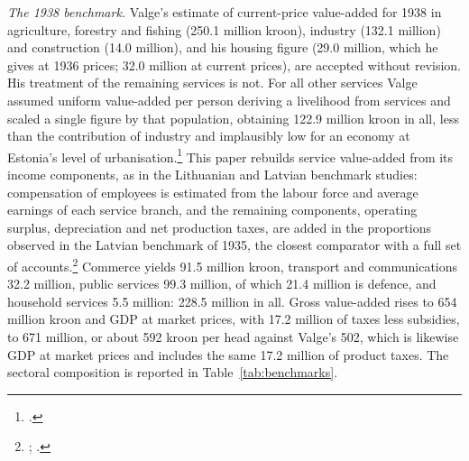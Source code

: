 \textit{The 1938 benchmark.} Valge's estimate of current-price value-added for 1938 in agriculture, forestry and fishing (250.1 million kroon), industry (132.1 million) and construction (14.0 million), and his housing figure (29.0 million, which he gives at 1936 prices; 32.0 million at current prices), are accepted without revision. His treatment of the remaining services is not. For all other services Valge assumed uniform value-added per person deriving a livelihood from services and scaled a single figure by that population, obtaining 122.9 million kroon in all, less than the contribution of industry and implausibly low for an economy at Estonia's level of urbanisation.\footnote{\autocite[2483, 2713--16, 2718]{valge2003all}.} This paper rebuilds service value-added from its income components, as in the Lithuanian and Latvian benchmark studies: compensation of employees is estimated from the labour force and average earnings of each service branch, and the remaining components, operating surplus, depreciation and net production taxes, are added in the proportions observed in the Latvian benchmark of 1935, the closest comparator with a full set of accounts.\footnote{\autocite{klimantas2019}; \autocite{norkuslatvia1935}.} Commerce yields 91.5 million kroon, transport and communications 32.2 million, public services 99.3 million, of which 21.4 million is defence, and household services 5.5 million: 228.5 million in all. Gross value-added rises to 654 million kroon and GDP at market prices, with 17.2 million of taxes less subsidies, to 671 million, or about 592 kroon per head against Valge's 502, which is likewise GDP at market prices and includes the same 17.2 million of product taxes. The sectoral composition is reported in Table~\ref{tab:benchmarks}.



